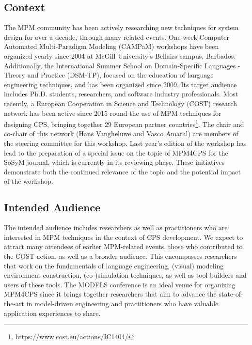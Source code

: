\subsection{Context}
The MPM community has been actively researching new techniques for system design 
for over a decade, through many related events.
One-week Computer Automated Multi-Paradigm Modeling (CAMPaM) workshops have been 
organized yearly since 2004 at McGill University’s Bellairs campus, Barbados. 
Additionally, the International Summer School on Domain-Specific Languages - 
Theory and Practice (DSM-TP), focused on the education of language engineering 
techniques, and has been organized since 2009.
Its target audience includes Ph.D. students, researchers, and software industry 
professionals.
Most recently, a European Cooperation in Science and Technology (COST) research 
network has been active since 2015 round the use of MPM techniques for designing 
CPS, bringing together 29 European partner countries\footnote{https://www.cost.eu/actions/IC1404/}.
The chair and co-chair of this network (Hans Vangheluwe and Vasco Amaral) are 
members of the steering committee for this workshop.
Last year's edition of the workshop has lead to the preparation of a special issue on the topic of MPM4CPS for the SoSyM journal, which is currently in its reviewing phase.
These initiatives demonstrate both the continued relevance of the topic and the 
potential impact of the workshop.


\subsection{Intended Audience}
The intended audience includes researchers as well as practitioners who are 
interested in MPM techniques in the context of CPS development.
We expect to attract many attendees of earlier MPM-related events, those who 
contributed to the COST action, as well as a broader audience.
This encompasses researchers that work on the fundamentals of language 
engineering, (visual) modeling environment construction, (co-)simulation 
techniques, as well as tool builders and users of these tools.
The MODELS conference is an ideal venue for organizing MPM4CPS since it brings 
together researchers that aim to advance the state-of-the-art in model-driven 
engineering and practitioners who have valuable application experiences to share.

